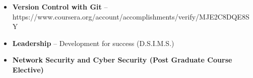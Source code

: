 


\begin{itemize}
    \item \small \textbf{Version Control with Git} -- https://www.coursera.org/account/accomplishments/verify/MJE2C8DQE8SY
    \item \small \textbf{Leadership} -- Development for success (D.S.I.M.S.)
    \item \small \textbf{Network Security and Cyber Security (Post Graduate Course Elective)}
\end{itemize}